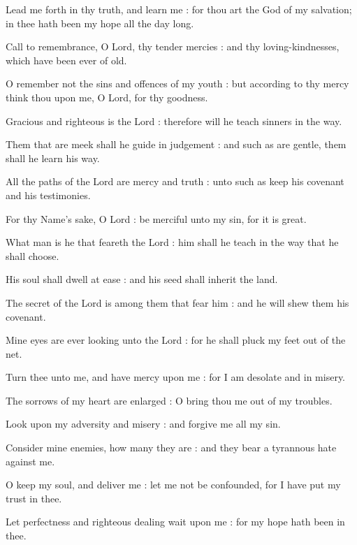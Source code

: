 Lead me forth in thy truth, and learn me : for thou art the God of my salvation; in thee hath been my hope all the day long.\par
{}Call to remembrance, O Lord, thy tender mercies : and thy loving-kindnesses, which have been ever of old.\par
{}O remember not the sins and offences of my youth : but according to thy mercy think thou upon me, O Lord, for thy goodness.\par
{}Gracious and righteous is the Lord : therefore will he teach sinners in the way.\par
{}Them that are meek shall he guide in judgement : and such as are gentle, them shall he learn his way.\par
{}All the paths of the Lord are mercy and truth : unto such as keep his covenant and his testimonies.\par
{}For thy Name's sake, O Lord : be merciful unto my sin, for it is great.\par
{}What man is he that feareth the Lord : him shall he teach in the way that he shall choose.\par
{}His soul shall dwell at ease : and his seed shall inherit the land.\par
{}The secret of the Lord is among them that fear him : and he will shew them his covenant.\par
{}Mine eyes are ever looking unto the Lord : for he shall pluck my feet out of the net.\par
{}Turn thee unto me, and have mercy upon me : for I am desolate and in misery.\par
{}The sorrows of my heart are enlarged : O bring thou me out of my troubles.\par
{}Look upon my adversity and misery : and forgive me all my sin.\par
{}Consider mine enemies, how many they are : and they bear a tyrannous hate against me.\par
{}O keep my soul, and deliver me : let me not be confounded, for I have put my trust in thee.\par
{}Let perfectness and righteous dealing wait upon me : for my hope hath been in thee.\par
